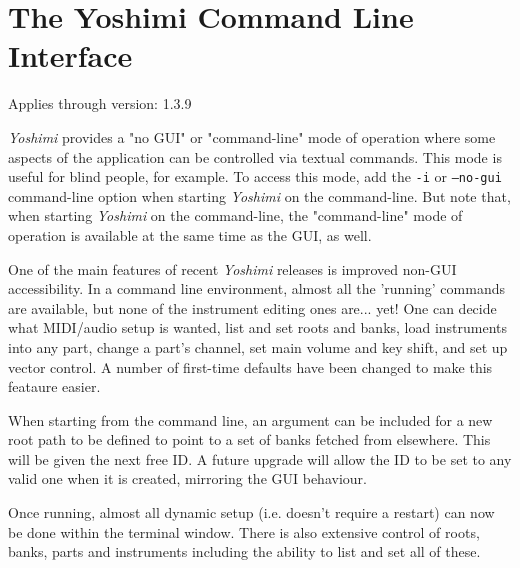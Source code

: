 %
%
%

\section{The Yoshimi Command Line Interface}
\label{sec:command_line}

   Applies through version:  1.3.9

   \textsl{Yoshimi} provides a "no GUI" or "command-line" mode of operation
   where some aspects of the application can be controlled via textual commands.
   This mode is useful for blind people, for example.  To access this mode, add
   the \texttt{-i} or \texttt{--no-gui} command-line option when starting
   \textsl{Yoshimi} on the command-line.  But note that, when starting
   \textsl{Yoshimi} on the command-line, the "command-line" mode of operation is
   available at the same time as the GUI, as well.

   One of the main features of recent \textsl{Yoshimi} releases
   is improved non-GUI
   accessibility.  In a command line environment, almost all the 'running'
   commands are available, but none of the instrument editing ones are... yet!
   One can decide what MIDI/audio setup is wanted, list and set roots and banks,
   load instruments into any part, change a part's channel, set main volume and
   key shift, and set up vector control.  A number of first-time defaults have
   been changed to make this feataure easier.

   When starting from the command line, an argument can be included for a new
   root path to be defined to point to a set of banks fetched from elsewhere.
   This will be given the next free ID. A future upgrade will allow the ID to
   be set to any valid one when it is created, mirroring the GUI behaviour.

   Once running, almost all dynamic setup (i.e. doesn't require a restart) can now
   be done within the terminal window. There is also extensive control of roots,
   banks, parts and instruments including the ability to list and set all of
   these.

